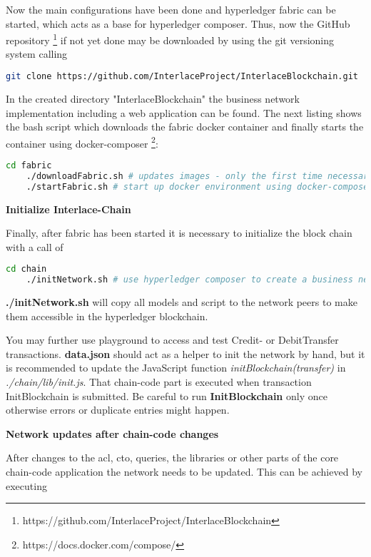 Now the main configurations have been done and hyperledger fabric can be started, which acts as a base for hyperledger composer. Thus, now the GitHub repository \footnote{https://github.com/InterlaceProject/InterlaceBlockchain} if not yet done may be downloaded by using the git versioning system calling

\begin{lstlisting}[language=bash]
	git clone https://github.com/InterlaceProject/InterlaceBlockchain.git
\end{lstlisting}

In the created directory "InterlaceBlockchain" the business network implementation including a web application can be found. The next listing shows the bash script which downloads the fabric docker container and finally starts the container using docker-composer \footnote{https://docs.docker.com/compose/}:

\begin{lstlisting}[language=bash]
	cd fabric
	./downloadFabric.sh # updates images - only the first time necessary
	./startFabric.sh # start up docker environment using docker-compose
\end{lstlisting}

\textbf{Initialize Interlace-Chain}

Finally, after fabric has been started it is necessary to initialize the block chain with a call of

\begin{lstlisting}[language=bash]
	cd chain
	./initNetwork.sh # use hyperledger composer to create a business network and deploy it
\end{lstlisting}

\textbf{./initNetwork.sh} will copy all models and script to the network peers to make them accessible in the hyperledger blockchain.

You may further use playground to access and test Credit- or DebitTransfer transactions. \textbf{data.json} should act as a helper to init the network by hand, but it is recommended to update the JavaScript function \textit{initBlockchain(transfer)} in \textit{./chain/lib/init.js}. That chain-code part is executed when transaction InitBlockchain is submitted. Be careful to run \textbf{InitBlockchain} only once otherwise errors or duplicate entries might happen.

\textbf{Network updates after chain-code changes}

After changes to the acl, cto, queries, the libraries or other parts of the core chain-code application the network needs to be updated. This can be achieved by executing

